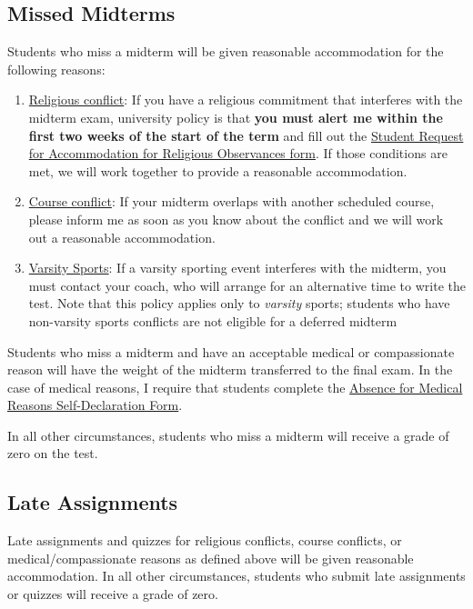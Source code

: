 \documentclass[
  letterpaper,
  DIV=11,
  numbers=noendperiod]{scrartcl}
\begin{document}
\hypertarget{missed-midterms}{%
\subsection{Missed Midterms}\label{missed-midterms}}

Students who miss a midterm will be given reasonable accommodation for
the following reasons:

\begin{enumerate}
\def\labelenumi{\arabic{enumi})}
\item
  \ul{Religious conflict}: If you have a religious commitment that
  interferes with the midterm exam, university policy is that
  \textbf{you must alert me within the first two weeks of the start of
  the term} and fill out the
  \href{https://web.wlu.ca/accommodations/}{Student Request for
  Accommodation for Religious Observances form}. If those conditions are
  met, we will work together to provide a reasonable accommodation.
\item
  \ul{Course conflict}: If your midterm overlaps with another scheduled
  course, please inform me as soon as you know about the conflict and we
  will work out a reasonable accommodation.
\item
  \ul{Varsity Sports}: If a varsity sporting event interferes with the
  midterm, you must contact your coach, who will arrange for an
  alternative time to write the test. Note that this policy applies only
  to \emph{varsity} sports; students who have non-varsity sports
  conflicts are not eligible for a deferred midterm
\end{enumerate}

Students who miss a midterm and have an acceptable medical or
compassionate reason will have the weight of the midterm transferred to
the final exam. In the case of medical reasons, I require that students
complete the \href{https://web.wlu.ca/illness/}{Absence for Medical
Reasons Self-Declaration Form}.

In all other circumstances, students who miss a midterm will receive a
grade of zero on the test.

\hypertarget{late-assignments}{%
\subsection{Late Assignments}\label{late-assignments}}

Late assignments and quizzes for religious conflicts, course conflicts,
or medical/compassionate reasons as defined above will be given
reasonable accommodation. In all other circumstances, students who
submit late assignments or quizzes will receive a grade of zero.
\end{document}
